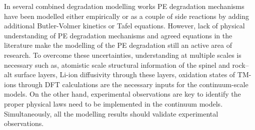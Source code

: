 \documentclass[aps,prb,twocolumn,superscriptaddress,reprint]{revtex4-1}
\begin{document}
In several combined degradation modelling works PE degradation mechanisms have been modelled either empirically or as a couple of side reactions by adding additional Butler-Volmer kinetics or Tafel equations. \cite{lin2013comprehensive,reniers2019review} However, lack of physical understanding of PE degradation mechanisms and agreed equations in the literature make the modelling of the PE degradation still an active area of research. To overcome these uncertainties, understanding at multiple scales is necessary such as, atomistic scale structural information of the spinel and rock--alt surface layers, Li-ion diffusivity through these layers, oxidation states of TM-ions through DFT calculations are the necessary inputs for the continuum-scale models. On the other hand, experimental observations are key to identify the proper physical laws need to be implemented in the continuum models. Simultaneously, all the modelling results should validate experimental observations.


\end{document}
